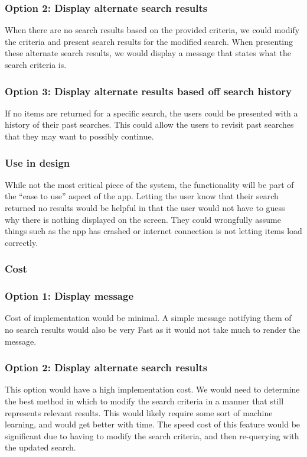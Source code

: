 \documentclass[journal,compsoc, 10pt, draftclsnofoot, onecolumn]{IEEEtran}
\begin{document}
\subsubsection*{Option 2: Display alternate search results}
When there are no search results based on the provided criteria, we could 
modify the criteria and present search results for the modified search. When 
presenting these alternate search results, we would display a message that 
states what the search criteria is.
\subsubsection*{Option 3: Display alternate results based off search history}
If no items are returned for a specific search, the users could be presented 
with a history of their past searches. This could allow the users to revisit 
past searches that they may want to possibly continue.
\subsubsection{Use in design}
While not the most critical piece of the system, the functionality will be part 
of the ``ease to use'' aspect of the app. Letting the user know that their 
search returned no results would be helpful in that the user would not have to 
guess why there is nothing displayed on the screen. They could wrongfully 
assume things such as the app has crashed or internet connection is not 
letting items load correctly.
\subsubsection{Cost}
\subsubsection*{Option 1: Display message}
Cost of implementation would be minimal. A simple message notifying them of no 
search results would also be very Fast as it would not take much to render the 
message. 
\subsubsection*{Option 2: Display alternate search results}
This option would have a high implementation cost. We would need to determine 
the best method in which to modify the search criteria in a manner that still 
represents relevant results. This would likely require some sort of machine 
learning, and would get better with time. The speed cost of this feature would 
be significant due to having to modify the search criteria, and then 
re-querying with the updated search.
\end{document}
